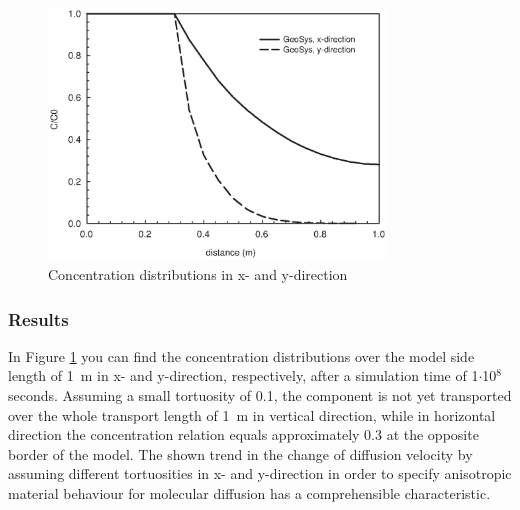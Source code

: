 \begin{figure}[htbp]
\centering
\includegraphics[width=0.8\textwidth]{PART_II/C/fig512.EPS}
\caption{Concentration distributions in x- and y-direction}
\label{fig512}
\end{figure}

\subsubsection{Results}

In Figure \ref{fig512} you can find the concentration distributions over the model side length of 1~m in x- and y-direction, respectively, after a simulation time of 1$\cdot$10$^8$ seconds. Assuming a small tortuosity of 0.1, the component is not yet transported over the whole transport length of 1~m in vertical direction, while in horizontal direction the concentration relation equals approximately 0.3 at the opposite border of the model. The shown trend in the change of diffusion velocity by assuming different tortuosities in x- and y-direction in order to specify anisotropic material behaviour for molecular diffusion has a comprehensible characteristic.
